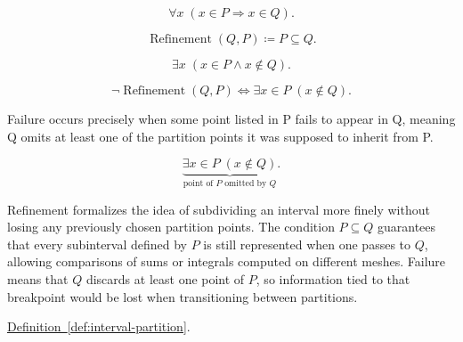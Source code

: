 \begin{remark*}
\[
\forall x\;(x\in P \Rightarrow x\in Q).
\]
\end{remark*}

\begin{remark*}
\[
\operatorname{Refinement}(Q,P) \coloneqq P \subseteq Q.
\]
\end{remark*}

\begin{remark*}
\[
\exists x\;(x\in P \land x\notin Q).
\]
\end{remark*}

\begin{remark*}
\[
\neg \operatorname{Refinement}(Q,P) \Longleftrightarrow \exists x \in P\; (x \notin Q).
\]
\end{remark*}

\begin{remark*}
Failure occurs precisely when some point listed in P fails to appear in Q, meaning Q omits at least one of the partition points it was supposed to inherit from P.
\end{remark*}

\begin{remark*}
\[
\underbrace{\exists x \in P\; (x \notin Q)}_{\text{point of }P\text{ omitted by }Q}.
\]
\end{remark*}

\begin{remark*}[Interpretation]
Refinement formalizes the idea of subdividing an interval more finely without losing any previously chosen partition points. The condition $P \subseteq Q$ guarantees that every subinterval defined by $P$ is still represented when one passes to $Q$, allowing comparisons of sums or integrals computed on different meshes. Failure means that $Q$ discards at least one point of $P$, so information tied to that breakpoint would be lost when transitioning between partitions.
\end{remark*}

\begin{remark*}[Dependencies]
\hyperref[def:interval-partition]{Definition~\ref*{def:interval-partition}}.
\end{remark*}




